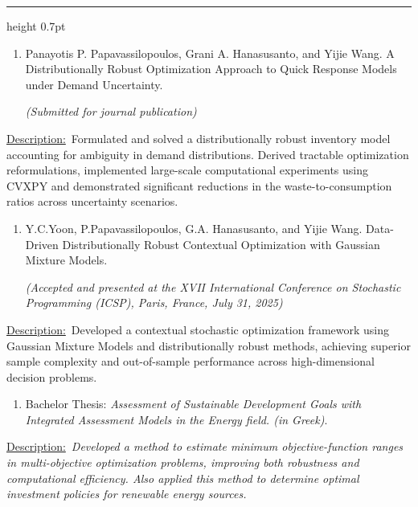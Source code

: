 \documentclass[11pt,a4paper]{article}
\newcommand{\cvsection}[1]{\par\vspace{13pt}{\bfseries #1}\par\nobreak\hrule height 0.7pt\relax\vspace{2pt}}
\newcommand{\entrygap}{\par\vspace{3pt}}
\newcommand{\cvdescription}{\underline{Description:}\ }
\begin{document}
\cvsection{PUBLICATIONS}
\begin{enumerate}[leftmargin=18pt,label=\arabic*.,itemsep=0pt,parsep=0pt,topsep=0pt,partopsep=0pt]
\item Panayotis P. Papavassilopoulos, Grani A. Hanasusanto, and Yijie Wang. A Distributionally Robust Optimization Approach to Quick Response Models under Demand Uncertainty.\par
\textit{(Submitted for journal publication)}
\end{enumerate}
\cvdescription Formulated and solved a distributionally robust inventory model accounting for ambiguity in demand distributions. Derived tractable optimization reformulations, implemented large-scale computational experiments using CVXPY and demonstrated significant reductions in the waste-to-consumption ratios across uncertainty scenarios.
\entrygap
\begin{enumerate}[leftmargin=18pt,label=\arabic*.,start=2,itemsep=0pt,parsep=0pt,topsep=0pt,partopsep=0pt]
\item Y.C.Yoon, P.Papavassilopoulos, G.A. Hanasusanto, and Yijie Wang. Data-Driven Distributionally Robust Contextual Optimization with Gaussian Mixture Models.\par
\textit{(Accepted and presented at the XVII International Conference on Stochastic Programming (ICSP), Paris, France, July 31, 2025)}
\end{enumerate}
\cvdescription Developed a contextual stochastic optimization framework using Gaussian Mixture Models and distributionally robust methods, achieving superior sample complexity and out-of-sample performance across high-dimensional decision problems.
\entrygap
\begin{enumerate}[leftmargin=18pt,label=\arabic*.,start=3,itemsep=0pt,parsep=0pt,topsep=0pt,partopsep=0pt]
\item Bachelor Thesis: \textit{Assessment of Sustainable Development Goals with Integrated Assessment Models in the Energy field. (in Greek)}.
\end{enumerate}
\cvdescription\textit{Developed a method to estimate minimum objective-function ranges in multi-objective optimization problems, improving both robustness and computational efficiency. Also applied this method to determine optimal investment policies for renewable energy sources.}
\end{document}
